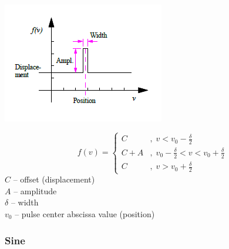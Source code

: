 \noindent
\begin{minipage}{0.45\textwidth}
  \includegraphics[width=\textwidth]{Figures/4-Functions-pulse}
\end{minipage}%
\begin{minipage}{0.55\textwidth}
  $$
    f(v)=\left\{\begin{array}{ll}
      C   &,\; v < v_0 - \frac{\delta}{2} \\
      C+A &,\; v_0 - \frac{\delta}{2} < v < v_0 + \frac{\delta}{2} \\
      C   &,\; v > v_0 + \frac{\delta}{2}
    \end{array}\right.
  $$
  $C$ -- offset (displacement) \\
  $A$ -- amplitude \\
  $\delta$ -- width \\
  $v_0$ -- pulse center abscissa value (position)
\end{minipage}

\subsubsection{Sine}

